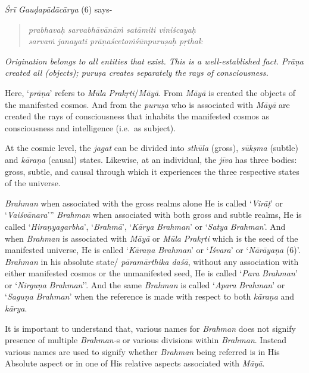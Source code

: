 \emph{Śrī Gauḍapādācārya} (6) says-
\vskip -10pt

\begin{verse}
\emph{prabhavaḥ sarvabhāvānāṁ satāmiti viniścayaḥ }\\
\emph{sarvaṁ janayati prāṇaścetoṁśūnpuruṣaḥ pṛthak }
\end{verse}
\vskip -10pt

\emph{Origination belongs to all entities that exist. This is a well-established fact. Prāṇa created all (objects); puruṣa creates separately the rays of consciousness.}

Here, `\emph{prāṇa}' refers to \emph{Mūla} \emph{Prakṛti}/\emph{Māyā}. From \emph{Māyā} is created the objects of the manifested cosmos. And from the \emph{puruṣa} who is associated with \emph{Māyā} are created the rays of consciousness that inhabits the manifested cosmos as consciousness and intelligence (i.e.\ as subject).

At the cosmic level, the \emph{jagat} can be divided into \emph{sthūla} (gross), \emph{sūkṣma} (subtle) and \emph{kāraṇa} (causal) states. Likewise, at an individual, the \emph{jīva} has three bodies: gross, subtle, and causal through which it experiences the three respective states of the universe.

\emph{Brahman} when associated with the gross realms alone He is called `\emph{Virāṭ}' or `\emph{Vaiśvānara}''' \emph{Brahman} when associated with both gross and subtle realms, He is called `\emph{Hiraṇyagarbha}', `\emph{Brahmā}', `\emph{Kārya} \emph{Brahman}' or `\emph{Satya} \emph{Brahman}'. And when \emph{Brahman} is associated with \emph{Māyā} or \emph{Mūla} \emph{Prakṛti} which is the seed of the manifested universe, He is called `\emph{Kāraṇa} \emph{Brahman}' or `\emph{Īśvara}' or `\emph{Nārāyaṇa} (6)'. \emph{Brahman} in his absolute state/ \emph{pāramārthika daśā}, without any association with either manifested cosmos or the unmanifested seed, He is called `\emph{Para} \emph{Brahman}' or `\emph{Nirguṇa} \emph{Brahman}''. And the same \emph{Brahman} is called `\emph{Apara} \emph{Brahman}' or `\emph{Saguṇa} \emph{Brahman}' when the reference is made with respect to both \emph{kāraṇa} and \emph{kārya}.

It is important to understand that, various names for \emph{Brahman} does not signify presence of multiple \emph{Brahman-}s or various divisions within \emph{Brahman}. Instead various names are used to signify whether \emph{Brahman} being referred is in His Absolute aspect or in one of His relative aspects associated with \emph{Māyā}.

